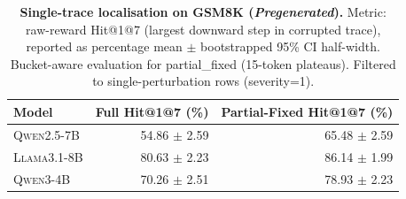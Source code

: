 \begin{table}[t]
\centering
\small
\renewcommand{\arraystretch}{1.08}
\begin{tabular}{l r r}
\toprule
\textbf{Model} & \textbf{Full Hit@1@7 (\%)} & \textbf{Partial-Fixed Hit@1@7 (\%)} \\
\midrule
\textsc{Qwen2.5-7B} & 54.86 $\pm$ 2.59 & 65.48 $\pm$ 2.59 \\
\textsc{Llama3.1-8B} & 80.63 $\pm$ 2.23 & 86.14 $\pm$ 1.99 \\
\textsc{Qwen3-4B} & 70.26 $\pm$ 2.51 & 78.93 $\pm$ 2.23 \\
\bottomrule
\end{tabular}
\caption{\textbf{Single-trace localisation on GSM8K (\textit{Pregenerated}).} Metric: raw-reward Hit@1@7 (largest downward step in corrupted trace), reported as percentage mean $\pm$ bootstrapped 95\% CI half-width. Bucket-aware evaluation for partial_fixed (15-token plateaus). Filtered to single-perturbation rows (severity=1).}
\label{tab:localisation_hit1at7_pregenerated_full_vs_partial_raw}
\end{table}